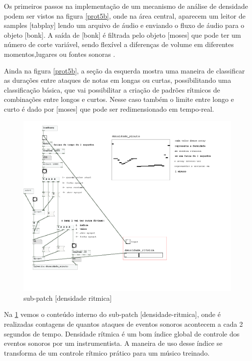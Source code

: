 \documentclass{ppgmus}
\begin{document}
Os primeiros passos na implementação de um mecanismo de análise de densidade podem ser vistos na figura \ref{prot5b},
onde na área central, aparecem um leitor de samples [tabplay\texttildelow] lendo um arquivo de
áudio e enviando o fluxo de áudio para o objeto [bonk\texttildelow]. A saída de [bonk\texttildelow] é filtrada
pelo objeto [moses] que pode ter um número de corte variável, sendo flexível a diferenças
de volume em diferentes momentos,lugares ou fontes sonoras .

Ainda na figura \ref{prot5b}, a seção da esquerda mostra uma maneira de classificar as durações
entre ataques de notas em longas ou curtas, possibilitando uma classificação básica,
que vai possibilitar a criação de padrões rítmicos de combinações entre longos e curtos.
Nesse caso também o limite entre longo e curto é dado por [moses] que pode ser redimensionado
em tempo-real. 

\begin{figure}
\includegraphics[scale=.75]{prot5c}
\caption{sub-patch [densidade ritmica]}
\label{prot5c}
\end{figure}


Na \ref{prot5c} vemos o conteúdo interno do sub-patch [densidade-ritmica], onde é realizadas
contagens de quantos ataques de eventos sonoros acontecem a cada 2 segundos de tempo.
Densidade rítmica é um bom índice global de controle dos eventos sonoros por um instrumentista.
A maneira de uso desse índice se transforma de um controle rítmico prático para um
músico treinado.
\end{document}
